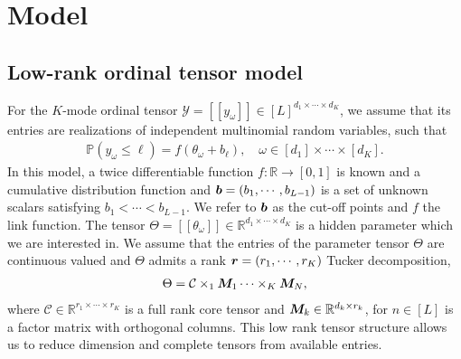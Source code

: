 \documentclass{article}
\theoremstyle{plain}
\theoremstyle{definition}
\begin{document}
\section{Model}
\subsection{Low-rank ordinal tensor model}
For the $K$-mode ordinal tensor $\mathcal{Y} = [\![ y_\omega]\!]\in[L]^{d_1\times\cdots\times d_K}$, we assume that its entries are realizations of independent multinomial random variables, such that
\begin{equation}
    \begin{aligned}
        \label{mainmodel}
        \mathbb{P}(y_\omega\leq \ell) = f(\theta_\omega+b_\ell), \quad \omega\in [d_1]\times\cdots\times[d_K].
    \end{aligned}
\end{equation}
In this model, a twice differentiable function $f: \mathbb{R}\rightarrow [0,1]$  is known and a cumulative distribution function and $\bm{b} = (b_1,\cdots,b_{L-1})$ is a set of unknown scalars satisfying $b_1<\cdots<b_{L-1}$. We refer to $\bm{b}$ as the cut-off points and $f$ the link function.
The tensor $\Theta = [\![\theta_\omega]\!]\in \mathbb{R}^{d_1\times\cdots\times d_K}$
is a hidden parameter which we are interested in. We assume that the entries of the parameter tensor $\Theta$ are continuous valued and $\Theta$ admits a rank $\bm{r} = (r_1,\cdots,r_K)$ Tucker decomposition,
\begin{equation}
    \begin{aligned}
        \label{tucker}
        \Theta = \mathcal{C}\times_1\bm M_1\cdots\times_K\bm M_N,
    \end{aligned}
\end{equation}
where $\mathcal{C}\in \mathbb{R}^{r_1\times\cdots\times r_K}$ is a full rank core tensor and $\bm M_k\in \mathbb{R}^{d_k\times r_k}$, for $n \in [L]$ is a factor matrix with orthogonal columns. This low rank tensor structure allows us to reduce dimension and complete tensors from available entries.
\end{document}
